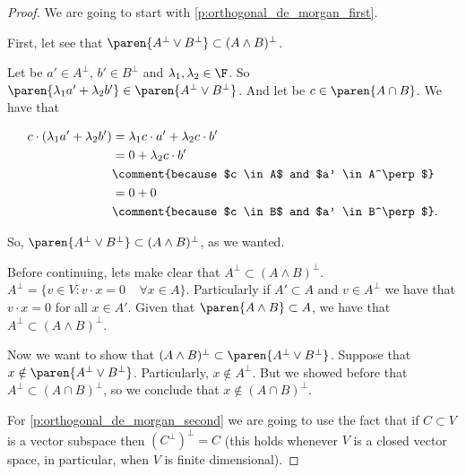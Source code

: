 \begin{proof}
    We are going to start with \eqref{p:orthogonal_de_morgan_first}.\pn
    
    First, let see that $\paren{A^\perp \vee B^\perp} \subset (A \wedge B)^\perp$.\pn
    
    Let be $a' \in A^\perp$, $b' \in B^\perp$ and $\lambda_1,\lambda_2 \in \F$. So $\paren{\lambda_1 a' + \lambda_2 b'} \in \paren{A^\perp \vee B^\perp}$. 
    And let be $c \in \paren{A \cap B}$. We have that\pn
    
    \begin{align}
            c \cdot (\lambda_1 a' + \lambda_2 b')   &=  \lambda_1 c \cdot a' + \lambda_2 c \cdot b'     \\
                                                    &=  0   +   \lambda_2 c \cdot b'                    \\
                                                    &\comment{because $c \in A$ and $a' \in A^\perp$}   \\
                                                    &=  0   +   0                                       \\
                                                    &\comment{because $c \in B$ and $a' \in B^\perp$}.   \\
    \end{align}\pn
    
    So, $\paren{A^\perp \vee B^\perp} \subset (A \wedge B)^\perp$, as we wanted.\pn
    
    Before continuing, lets make clear that $A^\perp \subset (A \wedge B)^\perp$. $A^\perp = \{ v \in V : v \cdot x = 0 \;\;\;\; \forall x \in A \}$. 
    Particularly if $A' \subset A$ and $v \in A^\perp$ we have that $v \cdot x = 0$ for all $x \in A'$. Given that $\paren{A \wedge B} \subset A$, 
    we have that $A^\perp \subset (A \wedge B)^\perp$.\pn
        
    Now we want to show that $(A \wedge B)^\perp \subset \paren{A^\perp \vee B^\perp}$. Suppose that $x \notin \paren{A^\perp \vee B^\perp}$. Particularly, 
    $x \notin A^\perp$. But we showed before that $A^\perp \subset (A \cap B)^\perp$, so we conclude that $x \notin (A \cap B)^\perp$.\pn
    
    For \eqref{p:orthogonal_de_morgan_second} we are going to use the fact that if $C \subset V$ is a vector subspace then
    $(C^\perp)^\perp = C$ (this holds whenever $V$ is a closed vector space, in particular, when $V$ is finite dimensional).
    

\end{proof}
